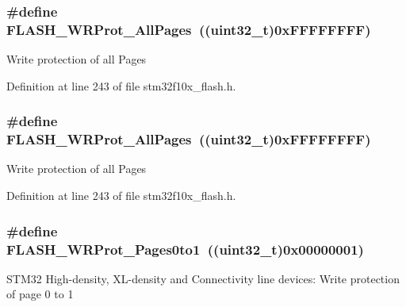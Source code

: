 \subsubsection[{\texorpdfstring{F\+L\+A\+S\+H\+\_\+\+W\+R\+Prot\+\_\+\+All\+Pages}{FLASH_WRProt_AllPages}}]{\setlength{\rightskip}{0pt plus 5cm}\#define F\+L\+A\+S\+H\+\_\+\+W\+R\+Prot\+\_\+\+All\+Pages~(({\bf uint32\+\_\+t})0x\+F\+F\+F\+F\+F\+F\+F\+F)}\hypertarget{group___option___bytes___write___protection_ga6fdaf38a559d606660dd10a411b77ea5}{}\label{group___option___bytes___write___protection_ga6fdaf38a559d606660dd10a411b77ea5}
Write protection of all Pages 

Definition at line 243 of file stm32f10x\+\_\+flash.\+h.

\subsubsection[{\texorpdfstring{F\+L\+A\+S\+H\+\_\+\+W\+R\+Prot\+\_\+\+All\+Pages}{FLASH_WRProt_AllPages}}]{\setlength{\rightskip}{0pt plus 5cm}\#define F\+L\+A\+S\+H\+\_\+\+W\+R\+Prot\+\_\+\+All\+Pages~(({\bf uint32\+\_\+t})0x\+F\+F\+F\+F\+F\+F\+F\+F)}\hypertarget{group___option___bytes___write___protection_ga6fdaf38a559d606660dd10a411b77ea5}{}\label{group___option___bytes___write___protection_ga6fdaf38a559d606660dd10a411b77ea5}
Write protection of all Pages 

Definition at line 243 of file stm32f10x\+\_\+flash.\+h.

\subsubsection[{\texorpdfstring{F\+L\+A\+S\+H\+\_\+\+W\+R\+Prot\+\_\+\+Pages0to1}{FLASH_WRProt_Pages0to1}}]{\setlength{\rightskip}{0pt plus 5cm}\#define F\+L\+A\+S\+H\+\_\+\+W\+R\+Prot\+\_\+\+Pages0to1~(({\bf uint32\+\_\+t})0x00000001)}\hypertarget{group___option___bytes___write___protection_ga7dfbb58b90b63afef11bfcf7a8f109e2}{}\label{group___option___bytes___write___protection_ga7dfbb58b90b63afef11bfcf7a8f109e2}
S\+T\+M32 High-\/density, X\+L-\/density and Connectivity line devices\+: Write protection of page 0 to 1 

